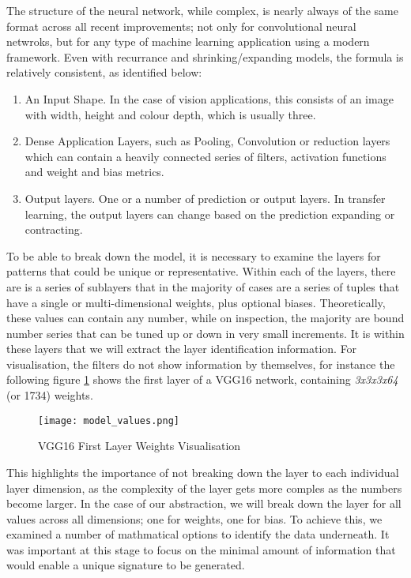 The structure of the neural network, while complex, is nearly always of the same format across all recent improvements; not only for convolutional neural netwroks, but for any type of machine learning application using a modern framework. Even with recurrance and shrinking/expanding models, the formula is relatively consistent, as identified below:

\begin{enumerate}
\item An Input Shape. In the case of vision applications, this consists of an image with width, height and colour depth, which is usually three.
\item Dense Application Layers, such as Pooling, Convolution or reduction layers which can contain a heavily connected series of filters, activation functions and weight and bias metrics.
\item Output layers. One or a number of prediction or output layers. In transfer learning, the output layers can change based on the prediction expanding or contracting.
\end{enumerate}

To be able to break down the model, it is necessary to examine the layers for patterns that could be unique or representative. Within each of the layers, there are is a series of sublayers that in the majority of cases are a series of tuples that have a single or multi-dimensional weights, plus optional biases. Theoretically, these values can contain any number, while on inspection, the majority are bound number series that can be tuned up or down in very small increments. It is within these layers that we will extract the layer identification information. For visualisation, the filters do not show information by themselves, for instance the following figure \ref{fig:vggWeightVisualisation} shows the first layer of a VGG16 network, containing \textit{3x3x3x64} (or 1734) weights.

\begin{figure}[!ht]
    \centering
    \texttt{[image: model\_values.png]}
    \caption{VGG16 First Layer Weights Visualisation}
    \label{fig:vggWeightVisualisation}
\end{figure}

This highlights the importance of not breaking down the layer to each individual layer dimension, as the complexity of the layer gets more comples as the numbers become larger. In the case of our abstraction, we will break down the layer for all values across all dimensions; one for weights, one for bias. To achieve this, we examined a number of mathmatical options to identify the data underneath. It was important at this stage to focus on the minimal amount of information that would enable a unique signature to be generated.

